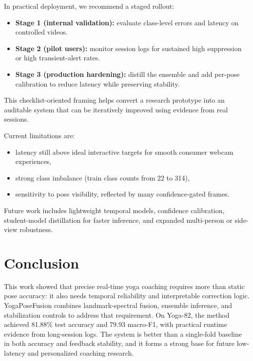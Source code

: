 \documentclass[conference]{IEEEtran}
\begin{document}
In practical deployment, we recommend a staged rollout:
\begin{itemize}
\item \textbf{Stage 1 (internal validation):} evaluate class-level errors and latency on controlled videos.
\item \textbf{Stage 2 (pilot users):} monitor session logs for sustained high suppression or high transient-alert rates.
\item \textbf{Stage 3 (production hardening):} distill the ensemble and add per-pose calibration to reduce latency while preserving stability.
\end{itemize}

This checklist-oriented framing helps convert a research prototype into an auditable system that can be iteratively improved using evidence from real sessions.

Current limitations are:
\begin{itemize}
\item latency still above ideal interactive targets for smooth consumer webcam experiences,
\item strong class imbalance (train class counts from 22 to 314),
\item sensitivity to pose visibility, reflected by many confidence-gated frames.
\end{itemize}

Future work includes lightweight temporal models, confidence calibration, student-model distillation for faster inference, and expanded multi-person or side-view robustness.

\section{Conclusion}
This work showed that precise real-time yoga coaching requires more than static pose accuracy: it also needs temporal reliability and interpretable correction logic. YogaPoseFusion combines landmark-spectral fusion, ensemble inference, and stabilization controls to address that requirement. On Yoga-82, the method achieved 81.88\% test accuracy and 79.93 macro-F1, with practical runtime evidence from long-session logs. The system is better than a single-fold baseline in both accuracy and feedback stability, and it forms a strong base for future low-latency and personalized coaching research.



\end{document}
